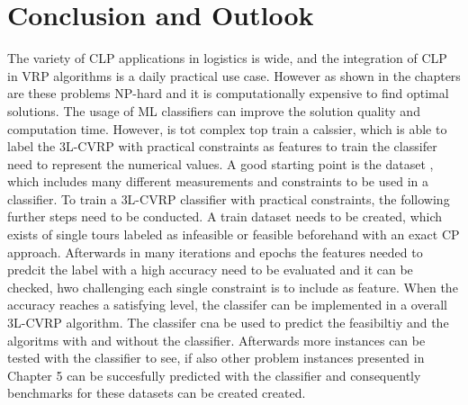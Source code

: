 \chapter{Conclusion and Outlook}
\label{sec:conclusion}

The variety of \gls{CLP} applications in logistics is wide, and the integration of \gls{CLP} in
\gls{VRP} algorithms is a daily practical use case. However as shown in the chapters are these problems
NP-hard and it is computationally expensive to find optimal solutions. The usage of \gls{ML} classifiers
can improve the solution quality and computation time. However, is tot complex top train a calssier, which
is able to label the \gls{3L-CVRP} with practical constraints as features to train the classifer need
to represent the numerical values. A good starting point is the dataset \krebsADataSetText, which includes
many different measurements and constraints to be used in a classifier. To train a \gls{3L-CVRP} classifier
with practical constraints, the following further steps need to be conducted. A train dataset needs to be created,
which exists of single tours labeled as infeasible or feasible beforehand with an exact \gls{CP} approach.
Afterwards in many iterations and epochs the features needed to predcit the label with a high accuracy need to be
evaluated and it can be checked, hwo challenging each single constraint is to include as feature. When
the accuracy reaches a satisfying level, the classifer can be implemented in a overall \gls{3L-CVRP} algorithm.
The classifer cna be used to predict the feasibiltiy and the algoritms with and without the classifier. Afterwards
more instances can be tested with the classifier to see, if also other problem instances presented in Chapter 5
can be succesfully predicted with the classifier and consequently benchmarks for these datasets can be created created.